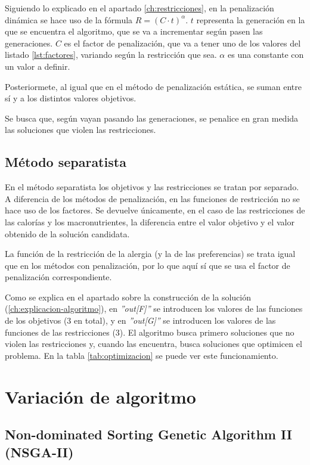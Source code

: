Siguiendo lo explicado en el apartado \ref{ch:restricciones}, en la penalización dinámica se hace uso de la fórmula \( R = (C \cdot t) ^ {\alpha} \). \(t\) representa la generación en la que se encuentra el algoritmo, que se va a incrementar según pasen las generaciones. \(C\) es el factor de penalización, que va a tener uno de los valores del listado \ref{lst:factores}, variando según la restricción que sea. \(\alpha\) es una constante con un valor a definir.

Posteriormete, al igual que en el método de penalización estática, se suman entre sí y a los distintos valores objetivos.

Se busca que, según vayan pasando las generaciones, se penalice en gran medida las soluciones que violen las restricciones.

\subsection{Método separatista}
\label{ch:metodo-separatista}

En el método separatista los objetivos y las restricciones se tratan por separado. A diferencia de los métodos de penalización, en las funciones de restricción no se hace uso de los factores. Se devuelve únicamente, en el caso de las restricciones de las calorías y los macronutrientes, la diferencia entre el valor objetivo y el valor obtenido de la solución candidata.

La función de la restricción de la alergia (y la de las preferencias) se trata igual que en los métodos con penalización, por lo que aquí sí que se usa el factor de penalización correspondiente.

Como se explica en el apartado sobre la construcción de la solución (\ref{ch:explicacion-algoritmo}), en \textit{''out[F]''} se introducen los valores de las funciones de los objetivos (3 en total), y en \textit{''out[G]''} se introducen los valores de las funciones de las restricciones (3). El algoritmo busca primero soluciones que no violen las restricciones y, cuando las encuentra, busca soluciones que optimicen el problema. En la tabla \ref{tab:optimizacion} se puede ver este funcionamiento.


\section{Variación de algoritmo}
\label{ch:distinto-algoritmo}

\subsection{Non-dominated Sorting Genetic Algorithm II (NSGA-II)}
\label{ch:nsga2}

